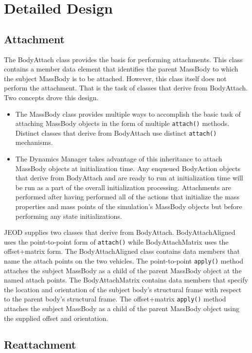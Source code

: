 \section{Detailed Design}

\subsection{Attachment}
The \ModelDesc BodyAttach class provides the basis for performing
attachments. This class contains a member
data element that identifies the parent MassBody to which the subject
MassBody is to be attached.
However, this class itself does not perform the
attachment. That is the task of classes that derive from BodyAttach.
Two concepts drove this design.
\begin{itemize}
\item The MassBody class provides multiple ways to accomplish the basic task of
  attaching MassBody objects in the form of multiple {\tt attach()} methods.
  Distinct classes that derive from BodyAttach use distinct
  {\tt attach()} mechanisms.
\item The Dynamics Manager takes advantage of this inheritance to attach
  MassBody objects at initialization time. Any enqueued BodyAction objects
  that derive from BodyAttach and are ready to run at initialization
  time will be run as a part of the overall initialization processing.
  Attachments are performed after having performed all of the actions
  that initialize the mass properties and mass points of the simulation's
  MassBody objects but before performing any state initializations.
\end{itemize}

JEOD supplies two classes that derive from BodyAttach.
BodyAttachAligned uses the point-to-point form of {\tt attach()}
while BodyAttachMatrix uses the offset+matrix form.
The BodyAttachAligned class contains data members that name the
attach points on the two vehicles.
The point-to-point {\tt apply()} method attaches the
subject MassBody as a child of the parent MassBody object at the named
attach points.
The BodyAttachMatrix contains data members that specify the location
and orientation of the subject body's structural frame with respect to
the parent body's structural frame. The offset+matrix {\tt apply()} method
attaches the subject MassBody as a child of the parent MassBody object
using the supplied offset and orientation.

\subsection{Reattachment}

